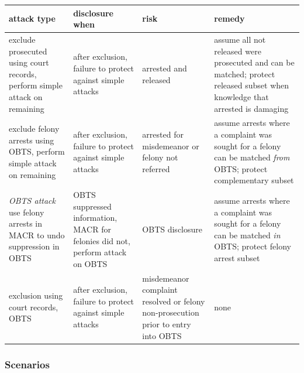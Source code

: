 \documentclass[]{article}
\begin{document}
\begin{center}
  \renewcommand{\arraystretch}{1.25}
   \begin{tabular}{p{117.734pt}p{117.734pt}p{58.867pt}p{117.734pt}}
    \textbf{attack type} & \textbf{disclosure when} & \textbf{risk} & \textbf{remedy} \\ \hline
    exclude prosecuted using court records, perform simple attack on remaining & after exclusion, failure to protect against simple attacks                     & arrested and released                                                             & assume all not released were prosecuted and can be matched; protect released subset when knowledge that arrested is damaging \\
    exclude felony arrests using OBTS, perform simple attack on remaining      & after exclusion, failure to protect against simple attacks                     & arrested for misdemeanor or felony not referred                                   & assume arrests where a complaint was sought for a felony can be matched \emph{from} OBTS; protect complementary subset      \\
    \emph{OBTS attack} use felony arrests in MACR to undo suppression in OBTS & OBTS suppressed information, MACR for felonies did not, perform attack on OBTS & OBTS disclosure                                                                   & assume arrests where a complaint was sought for a felony can be matched \emph{in} OBTS; protect felony arrest subset        \\
    exclusion using court records, OBTS                                        & after exclusion, failure to protect against simple attacks                     & misdemeanor complaint resolved or felony non-prosecution prior to entry into OBTS & none                                                                                                                         \\
  \end{tabular}
  \renewcommand{\arraystretch}{1.0}
\end{center}

\subsubsection{Scenarios}\label{scenarios}
\end{document}
